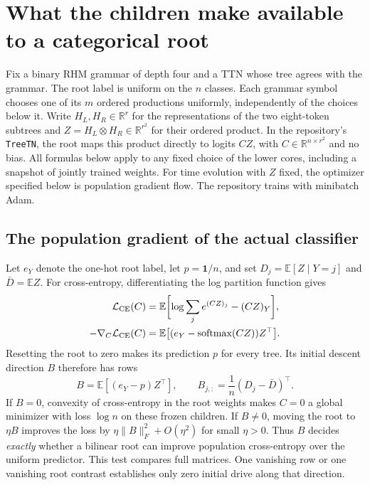 \section{What the children make available to a categorical root}
\label{sec:categorical-root}

Fix a binary RHM grammar of depth four and a TTN whose tree agrees with the
grammar. The root label is uniform on the $n$ classes. Each grammar symbol
chooses one of its $m$ ordered productions uniformly, independently of the
choices below it. Write $H_L,H_R\in\mathbb R^r$ for the representations
of the two eight-token subtrees and $Z=H_L\otimes H_R\in\mathbb R^{r^2}$
for their ordered product. In the repository's \texttt{TreeTN}, the root
maps this product directly to logits $CZ$, with $C\in\mathbb R^{n\times
r^2}$ and no bias. All formulas below apply to any fixed choice of the
lower cores, including a snapshot of jointly trained weights. For time
evolution with $Z$ fixed, the optimizer specified below is population
gradient flow. The repository trains with minibatch Adam.

\subsection{The population gradient of the actual classifier}

Let $e_Y$ denote the one-hot root label, let $p=\mathbf{1}/n$, and set
$D_j=\mathbb E[Z\mid Y=j]$ and $\bar D=\mathbb E Z$.
For cross-entropy, differentiating the log partition function gives
\begin{align}
 {\cal L}_{\rm CE}(C)
 &=\mathbb E\biggl[\log\sum_j e^{(CZ)_j} -(CZ)_Y\biggr],\\
 -\nabla_C{\cal L}_{\rm CE}(C)
 &=\mathbb E\big[(e_Y-\operatorname{softmax}(CZ))Z^\top\big].
 \label{eq:cat-full-gradient}
\end{align}
Resetting the root to zero makes its prediction $p$ for every tree. Its
initial descent direction $B$ therefore has rows
\begin{equation}
 B=\mathbb E[(e_Y-p)Z^\top],\qquad
 B_{j,:}=\frac{1}{n}(D_j-\bar D)^\top .
 \label{eq:cat-zero-gradient}
\end{equation}
If $B=0$, convexity of cross-entropy in the root weights makes $C=0$ a
global minimizer with loss $\log n$ on these frozen children. If $B\ne0$,
moving the root to $\eta B$ improves the loss by
$\eta\|B\|_F^2+O(\eta^2)$ for small $\eta>0$. Thus $B$ decides
\emph{exactly} whether a bilinear root can improve population
cross-entropy over the uniform predictor. This test compares full
matrices. One vanishing row or one vanishing root contrast establishes
only zero initial drive along that direction.

